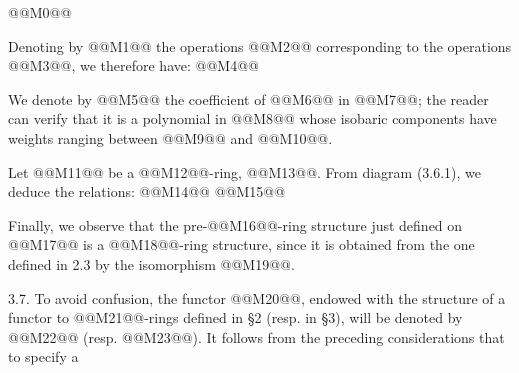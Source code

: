 @@M0@@

Denoting by @@M1@@ the operations @@M2@@ corresponding to the operations @@M3@@, we therefore have:
@@M4@@

We denote by @@M5@@ the coefficient of @@M6@@ in @@M7@@; the reader can verify that it is a polynomial in @@M8@@ whose isobaric components have weights ranging between @@M9@@ and @@M10@@.

Let @@M11@@ be a @@M12@@-ring, @@M13@@. From diagram (3.6.1), we deduce the relations:
@@M14@@
@@M15@@

Finally, we observe that the pre-@@M16@@-ring structure just defined on @@M17@@ is a @@M18@@-ring structure, since it is obtained from the one defined in 2.3 by the isomorphism @@M19@@.

3.7. To avoid confusion, the functor @@M20@@, endowed with the structure of a functor to @@M21@@-rings defined in §2 (resp. in §3), will be denoted by @@M22@@ (resp. @@M23@@). It follows from the preceding considerations that to specify a
